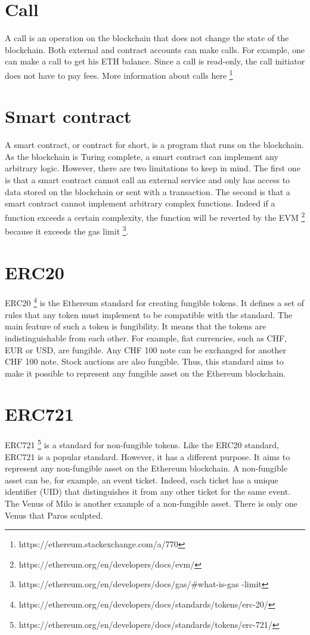 \documentclass[a4paper,11pt,oneside]{report}
\begin{document}
\section{Call}
A call is an operation on the blockchain that does not change the state of the blockchain. Both external and contract accounts can make calls. For example, one can make a call to get his ETH balance. Since a call is read-only, the call initiator does not have to pay fees. More information about calls here \footnote{https://ethereum.stackexchange.com/a/770}

\section{Smart contract}
A smart contract, or contract for short, is a program that runs on the blockchain. As the blockchain is Turing complete, a smart contract can implement any arbitrary logic. However, there are two limitations to keep in mind. The first one is that a smart contract cannot call an external service and only has access to data stored on the blockchain or sent with a transaction. The second is that a smart contract cannot implement arbitrary complex functions. Indeed if a function exceeds a certain complexity, the function will be reverted by the EVM \footnote{https://ethereum.org/en/developers/docs/evm/} because it exceeds the gas limit \footnote{https://ethereum.org/en/developers/docs/gas/#what-is-gas -limit }.

\section{ERC20}
ERC20 \footnote{https://ethereum.org/en/developers/docs/standards/tokens/erc-20/} is the Ethereum standard for creating fungible tokens. It defines a set of rules that any token must implement to be compatible with the standard. The main feature of such a token is fungibility. It means that the tokens are indistinguishable from each other. For example, fiat currencies, such as CHF, EUR or USD, are fungible. Any CHF 100 note can be exchanged for another CHF 100 note. Stock auctions are also fungible. Thus, this standard aims to make it possible to represent any fungible asset on the Ethereum blockchain. 

\section{ERC721}
ERC721 \footnote{https://ethereum.org/en/developers/docs/standards/tokens/erc-721/} is a standard for non-fungible tokens. Like the ERC20 standard, ERC721 is a popular standard. However, it has a different purpose. It aims to represent any non-fungible asset on the Ethereum blockchain. A non-fungible asset can be, for example, an event ticket. Indeed, each ticket has a unique identifier (UID) that distinguishes it from any other ticket for the same event. The Venus of Milo is another example of a non-fungible asset. There is only one Venus that Paros sculpted.
\end{document}

